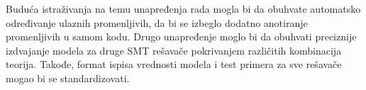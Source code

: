 \documentclass[12pt,oneside]{memoir}
\begin{document}
Buduća istraživanja na temu unapređenja rada mogla bi da obuhvate automatsko određivanje ulaznih promenljivih, da bi se izbeglo dodatno anotiranje promenljivih u samom kodu. Drugo unapređenje moglo bi da obuhvati preciznije izdvajanje modela za druge SMT rešavače pokrivanjem različitih kombinacija teorija. Takođe, format ispisa vrednosti modela i test primera za sve rešavače mogao bi se standardizovati. 


\literatura

\backmatter

\end{document}

